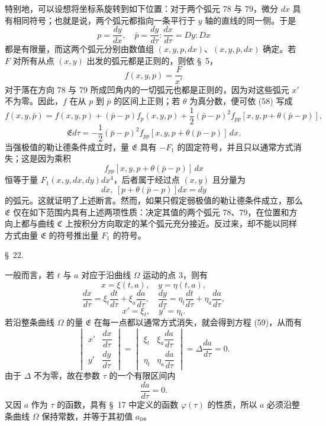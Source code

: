 \documentclass[11pt,a4paper,leqno]{article}
\begin{document}
特别地，可以设想将坐标系旋转到如下位置：对于两个弧元 78 与 79，微分 $dx$ 具有相同符号；也就是说，两个弧元都指向一条平行于 $y$ 轴的直线的同一侧。于是
\[
p=\frac{dy}{dx},\quad
\bar{p}=\frac{dy}{d\tau}:\frac{dx}{d\tau}=D y:D x
\]
都是有限量，而这两个弧元分别由数值组 $(x,y,p,dx)$、$(x,y,\bar{p},dx)$ 确定。若 $F$ 对所有从点 $(x,y)$ 出发的弧元都是正则的，则依 \S~5，
\[
f(x,y,p)=\frac{F}{x'}
\]
对于落在方向 78 与 79 所成凹角内的一切弧元也都是正则的，因为对这些弧元 $x'$ 不为零。因此，$f$ 在从 $p$ 到 $\bar{p}$ 的区间上正则；若 $\theta$ 为真分数，便可依 (58) 写成
\[
f(x,y,\bar{p})=f(x,y,p)+(\bar{p}-p)f_p(x,y,p)
+\frac{1}{2}(\bar{p}-p)^2 f_{pp}[x,y,p+\theta(\bar{p}-p)],
\]
\begin{equation}\tag{60}
\mathfrak{E}d\tau
=
-\frac{1}{2}(\bar{p}-p)^2 f_{pp}[x,y,p+\theta(\bar{p}-p)]\,dx.
\end{equation}
当强极值的勒让德条件成立时，量 $\mathfrak{E}$ 具有 $-F_1$ 的固定符号，并且只以通常方式消失；这是因为乘积
\[
f_{pp}[x,y,p+\theta(\bar{p}-p)]\,dx
\]
恒等于量 $F_1(x,y,dx,dy)dx^4$，后者属于经过点 $(x,y)$ 且分量为
\[
dx,\ [p+\theta(\bar{p}-p)]dx=dy
\]
的弧元。这就证明了上述断言。然而，如果只假定弱极值的勒让德条件成立，那么 $\mathfrak{E}$ 仅在如下范围内具有上述两项性质：决定其值的两个弧元 78、79，在位置和方向上都与曲线 $\mathfrak{C}$ 上按积分方向取定的某个弧元充分接近。反过来，却不能以同样方式由量 $\mathfrak{E}$ 的符号推出量 $F_1$ 的符号。



\begin{center}{\large \S~22.}\end{center}

一般而言，若 $t$ 与 $a$ 对应于沿曲线 $\Omega$ 运动的点 3，则有
\[
x=\xi(t,a),\quad y=\eta(t,a),
\]
\[
\frac{dx}{d\tau}=\xi_t\frac{dt}{d\tau}+\xi_a\frac{da}{d\tau},\quad
\frac{dy}{d\tau}=\eta_t\frac{dt}{d\tau}+\eta_a\frac{da}{d\tau},
\]
\[
x'=\xi_t,\quad y'=\eta_t.
\]
若沿整条曲线 $\Omega$ 的量 $\mathfrak{E}$ 在每一点都以通常方式消失，就会得到方程 (59)，从而有
\[
\begin{vmatrix}
x' & \dfrac{dx}{d\tau}\\[0.7em]
y' & \dfrac{dy}{d\tau}
\end{vmatrix}
=
\begin{vmatrix}
\xi_t & \xi_a\dfrac{da}{d\tau}\\[0.7em]
\eta_t & \eta_a\dfrac{da}{d\tau}
\end{vmatrix}
=
\Delta\frac{da}{d\tau}=0.
\]
由于 $\Delta$ 不为零，故在参数 $\tau$ 的一个有限区间内
\[
\frac{da}{d\tau}=0.
\]
又因 $a$ 作为 $\tau$ 的函数，具有 \S~17 中定义的函数 $\varphi(\tau)$ 的性质，所以 $a$ 必须沿整条曲线 $\Omega$ 保持常数，并等于其初值 $a_0$。
\end{document}
